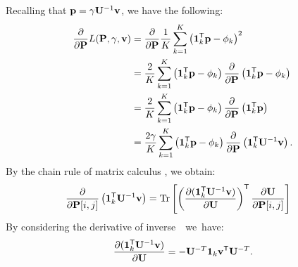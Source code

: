 \phipagerankgradient*
Recalling that $\mathbf{{p}} = \gamma \mathbf{{U}}^{-1} \mathbf{{v}}$,
we have the following:
\begin{equation*}
\begin{aligned}
\label{eq:gradient_fairness_loss}
    \frac{\partial}{\partial \mathbf{{P}}} L(\mathbf{{P}}, \gamma, \mathbf{{v}}) 
        & = \frac{\partial}{\partial \mathbf{{P}}} \frac{1}{K}
                \sum_{k=1}^{K}  \left(\mathbf{{1}}_{k}^{\mathsf{T}} \mathbf{{p}} - \phi_k\right)^2 \\
        & = \frac{2}{K} \sum_{k=1}^{K} \left(\mathbf{{1}}_{k}^{\mathsf{T}} \mathbf{{p}} - \phi_k\right) 
                \frac{\partial}{\partial \mathbf{{P}}} \left(\mathbf{{1}}_{k}^{\mathsf{T}} \mathbf{{p}} - \phi_k\right) \\
        & = \frac{2}{K} \sum_{k=1}^{K} \left(\mathbf{{1}}_{k}^{\mathsf{T}} \mathbf{{p}} - \phi_k\right) 
                \frac{\partial}{\partial \mathbf{{P}}} \left(\mathbf{{1}}_{k}^{\mathsf{T}} \mathbf{{p}}\right)  \\ 
        & = \frac{2 \gamma}{K} \sum_{k=1}^{K} \left(\mathbf{{1}}_{k}^{\mathsf{T}} \mathbf{{p}} - \phi_k\right) 
                \frac{\partial}{\partial \mathbf{{P}}} \left(\mathbf{{1}}_{k}^{\mathsf{T}} \mathbf{{U}}^{-1} \mathbf{{v}}\right). 
\end{aligned}
\end{equation*}
By the chain rule of matrix calculus \citep[Equation~(137)]{petersen_matrix_2008}, 
we obtain:
\begin{equation}
\label{eq:chain_rule}
\begin{aligned}
\frac{\partial}{\partial \mathbf{{P}}[i, j]} \left(\mathbf{{1}}_{k}^{\mathsf{T}} \mathbf{{U}}^{-1} \mathbf{{v}}\right) 
    & = \mathrm{Tr} 
        \left[ 
            \left( \frac{\partial (\mathbf{{1}}_{k}^{\mathsf{T}} \mathbf{{U}}^{-1} \mathbf{{v}})}{\partial \mathbf{{U}}} \right)^{\mathsf{T}} 
            \frac{\partial \mathbf{{U}}}{\partial \mathbf{{P}}[i, j]} 
        \right]
\end{aligned}
\end{equation}
By considering the derivative of inverse~\cite[Equation~(61)]{petersen_matrix_2008}~we~have:
\begin{equation*}
    \frac{\partial (\mathbf{{1}}_{k}^{\mathsf{T}} \mathbf{{U}}^{-1} \mathbf{{v}})}{\partial \mathbf{{U}}} 
        = -\mathbf{{U}}^{-T} \mathbf{{1}}_{k} \mathbf{{v}}^{\mathsf{T}} \mathbf{{U}}^{-T}.
\end{equation*}
